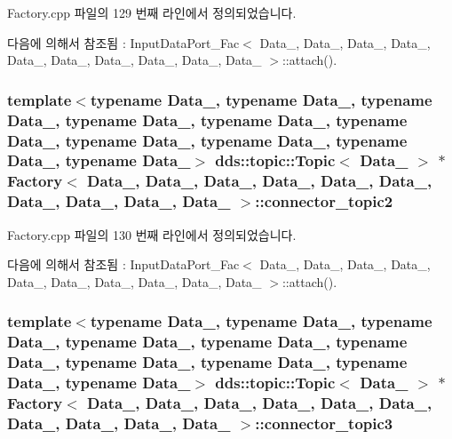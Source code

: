 Factory.\+cpp 파일의 129 번째 라인에서 정의되었습니다.



다음에 의해서 참조됨 \+:  Input\+Data\+Port\+\_\+\+Fac$<$ Data\+\_, Data\+\_, Data\+\_, Data\+\_, Data\+\_, Data\+\_, Data\+\_, Data\+\_, Data\+\_, Data\+\_ $>$\+::attach().

\subsubsection[{\texorpdfstring{connector\+\_\+topic2}{connector_topic2}}]{\setlength{\rightskip}{0pt plus 5cm}template$<$typename Data\+\_, typename Data\+\_, typename Data\+\_, typename Data\+\_, typename Data\+\_, typename Data\+\_, typename Data\+\_, typename Data\+\_, typename Data\+\_, typename Data\+\_$>$ dds\+::topic\+::\+Topic$<$ Data\+\_ $>$ $\ast$ {\bf Factory}$<$ Data\+\_, Data\+\_, Data\+\_, Data\+\_, Data\+\_, Data\+\_, Data\+\_, Data\+\_, Data\+\_, Data\+\_ $>$\+::connector\+\_\+topic2}\hypertarget{classFactory_ac7074f7a4d429bacd720150a248dc0e3}{}\label{classFactory_ac7074f7a4d429bacd720150a248dc0e3}


Factory.\+cpp 파일의 130 번째 라인에서 정의되었습니다.



다음에 의해서 참조됨 \+:  Input\+Data\+Port\+\_\+\+Fac$<$ Data\+\_, Data\+\_, Data\+\_, Data\+\_, Data\+\_, Data\+\_, Data\+\_, Data\+\_, Data\+\_, Data\+\_ $>$\+::attach().

\subsubsection[{\texorpdfstring{connector\+\_\+topic3}{connector_topic3}}]{\setlength{\rightskip}{0pt plus 5cm}template$<$typename Data\+\_, typename Data\+\_, typename Data\+\_, typename Data\+\_, typename Data\+\_, typename Data\+\_, typename Data\+\_, typename Data\+\_, typename Data\+\_, typename Data\+\_$>$ dds\+::topic\+::\+Topic$<$ Data\+\_ $>$ $\ast$ {\bf Factory}$<$ Data\+\_, Data\+\_, Data\+\_, Data\+\_, Data\+\_, Data\+\_, Data\+\_, Data\+\_, Data\+\_, Data\+\_ $>$\+::connector\+\_\+topic3}\hypertarget{classFactory_a637aec1cd43fdfb430f59858e6408a6e}{}\label{classFactory_a637aec1cd43fdfb430f59858e6408a6e}


